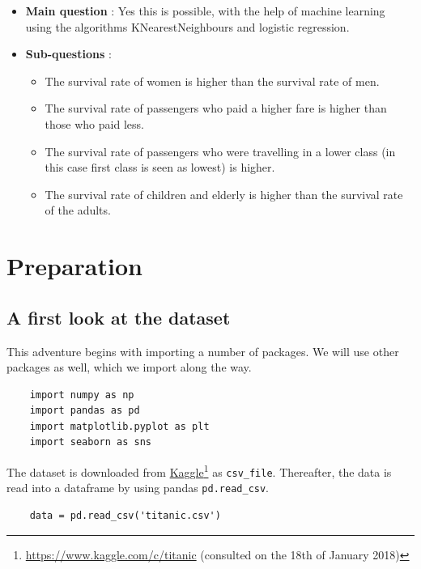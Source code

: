 \documentclass[11pt]{article}
\begin{document}
\begin{itemize}
\item \textbf{Main question} : Yes this is possible, with the help of machine learning using the algorithms KNearestNeighbours and logistic regression.
\item \textbf{Sub-questions} :

\begin{itemize}
\item The survival rate of women is higher than the survival rate of men.
\item The survival rate of passengers who paid a higher fare is higher than those who paid less.
\item The survival rate of passengers who were travelling in a lower class (in this case first class is seen as lowest) is higher.
\item The survival rate of children and elderly is higher than the survival rate of the adults.
\end{itemize}
\end{itemize}


\newpage
\section{Preparation}
\label{sec:org4d956da}

\subsection{A first look at the dataset}
\label{sec:org6d8ad16}

This adventure begins with importing a number of packages. We will use other packages as well, which we import along the way.

\begin{verbatim}
    import numpy as np
    import pandas as pd
    import matplotlib.pyplot as plt
    import seaborn as sns
\end{verbatim}

The dataset is downloaded from \href{https://www.kaggle.com/c/titanic/data}{Kaggle}\footnote{\url{https://www.kaggle.com/c/titanic} (consulted on the 18th of January 2018)} as \texttt{csv\_file}. Thereafter, the data is read into a dataframe by using pandas \texttt{pd.read\_csv}. 

\begin{verbatim}
    data = pd.read_csv('titanic.csv')
\end{verbatim}
\end{document}
